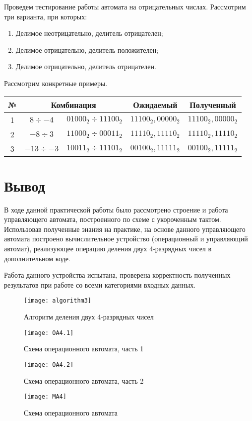\documentclass[a4paper,14pt]{extarticle}
\begin{document}
Проведем тестирование работы автомата на отрицательных числах. Рассмотрим три варианта, при которых:
\begin{enumerate}
	\item Делимое неотрицательно, делитель отрицателен;
	\item Делимое отрицательно, делитель положителен;
	\item Делимое отрицательно, делитель отрицателен.
\end{enumerate}
Рассмотрим конкретные примеры.
\vspace{2ex}\\
\begin{tabularx}{\linewidth}{|c|c|X|X|X|}%
	\hline
	\textbf{№} &\multicolumn{2}{c|}{\textbf{Комбинация}} & \multicolumn{1}{c|}{\small\textbf{Ожидаемый}} & \multicolumn{1}{c|}{\small\textbf{Полученный}}\\
	\hline
	1 &$8\div-4$& $01000_2\div 11100_2 $ & $11100_2,00000_2$ & $11100_2,00000_2$ \\ 
	\hline
	2&$-8\div3$& $11000_2\div00011_2$ &$11110_2,11110_2$ & $11110_2,11110_2$ \\
	\hline
	3&$-13\div-3$& $10011_2\div11101_2$ & $00100_2,11111_2$ & $00100_2,11111_2$ \\
	\hline
\end{tabularx}

\section {Вывод}
В ходе данной практической работы было рассмотрено строение и работа управляющего автомата, построенного по схеме с укороченным тактом. Использовав полученные знания на практике, на основе данного управляющего автомата построено вычислительное устройство (операционный и управляющий автомат), реализующее операцию деления двух 4-разрядных чисел в дополнительном коде.

Работа данного устройства испытана, проверена корректность полученных результатов при работе со всеми категориями входных данных. 

\label{tam}
\begin{figure}[h!]
	\centering
	\texttt{[image: algorithm3]}
	\caption {Алгоритм деления двух 4-разрядных чисел}
	\label{img:algorithm}
\end{figure}
\newpage
\begin{figure}[h!]
	\centering
	\texttt{[image: OA4.1]}
	\caption {Схема операционного автомата, часть 1}
	\label{img:oa1}
\end{figure}
\begin{figure}[h!]
	\centering
	\texttt{[image: OA4.2]}
	\caption {Схема операционного автомата, часть 2}
	\label{img:oa2}
\end{figure}

\begin{figure}[htbp]
	\centering
	\texttt{[image: MA4]}
	\caption {Схема операционного автомата}
	\label{img:ma}
\end{figure}
\end{document}
